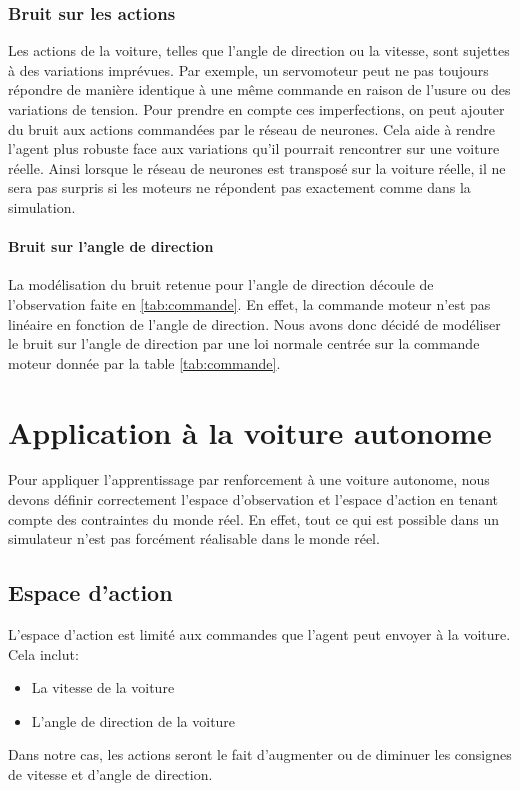\documentclass[french]{article}
\begin{document}
\subsubsection{Bruit sur les actions}

Les actions de la voiture, telles que l'angle de direction ou la vitesse, sont sujettes à des 
variations imprévues. Par exemple, un servomoteur peut ne pas toujours répondre de manière identique à une même 
commande en raison de l'usure ou des variations de tension. Pour prendre en compte ces imperfections, on peut 
ajouter du bruit aux actions commandées par le réseau de neurones. Cela aide à rendre l'agent plus robuste face 
aux variations qu'il pourrait rencontrer sur une voiture réelle. Ainsi lorsque le réseau de neurones est transposé sur la voiture réelle, il ne sera pas surpris si les moteurs ne répondent pas exactement comme dans la simulation.

\vspace{0.5cm}

\paragraph{Bruit sur l'angle de direction}
La modélisation du bruit retenue pour l'angle de direction découle de l'observation faite en \ref{tab:commande}. En effet, la commande moteur n'est pas linéaire en fonction de l'angle de direction. Nous avons donc décidé de modéliser le bruit sur l'angle de direction par une loi normale centrée sur la commande moteur donnée par la table \ref{tab:commande}.



\section{Application à la voiture autonome}
Pour appliquer l'apprentissage par renforcement à une voiture autonome, nous devons définir correctement 
l'espace d'observation et l'espace d'action en tenant compte des contraintes du monde réel. En effet, 
tout ce qui est possible dans un simulateur n'est pas forcément réalisable dans le monde réel. 

\subsection{Espace d'action}
L'espace d'action est limité aux commandes que l'agent peut envoyer à la voiture. Cela inclut:
\begin{itemize}
    \item La vitesse de la voiture
    \item L'angle de direction de la voiture
\end{itemize}
Dans notre cas, les actions seront le fait d'augmenter ou de diminuer les consignes de vitesse et d'angle de direction.
\end{document}
